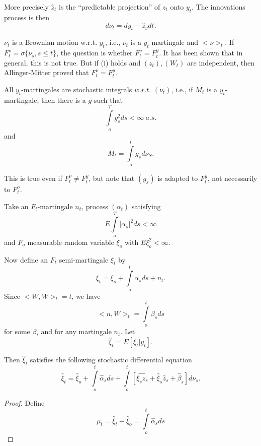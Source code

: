 More precisely $\hat{z}_t$ is the ``predictable projection'' of $z_t$
onto $y_t$. The innovations process is then  
\begin{equation}
  d \nu_t = dy_t - \hat{z}_y dt. \tag{7}\label{part2:sec1:eq7}
\end{equation}

\medskip
{}
  $\nu_t$  is a Brownian motion w.r.t. $y_t$, i.e., $\nu_t$ is a $y_t$
  martingale and $<\nu>_t$. If $F^\nu_t= \sigma\{\nu_s,s \le t\}$, the
  question is whether $F^\nu_t=F^y_t$. It has been shown that in
  general, this is not true. But if (i) holds and $(z_t), (W_t)$ are
  independent, then Allinger-Mitter proved that $F^\nu_t= F^y_t$. 


\medskip
{}
  All $y_t$-martingales are stochastic integrals $w.r.t$. $(\nu_t)$,
  i.e., if $M_t$ is a $y_t$-martingale, then there is a $g$ such that  
  $$ 
  \int\limits_{o}^T g^2_s ds < \infty ~a.s. 
  $$
  and
  $$
  M_t = \int\limits_{o}^t g_s d \nu_S. 
  $$ 

This is true even if $F^\nu_t \neq F^y_t$, but note that $(g_s)$ is
adapted to $F^y_t$, not necessarily to $F^\nu_t$. 

\medskip
{}\pageoriginale Take an
$F_t$-martingale $n_t$, process $(\alpha_t)$ satisfying  
$$
E \int\limits_{o}^T |\alpha_s|^2 ds < \infty
$$
and $F_o$ measurable random variable $\xi_o$ with $E \xi^2_o < \infty$.

\noindent
Now define an $F_t$ semi-martingale $\xi_t$ by 
\begin{equation*}
\xi_t = \xi_o + \int\limits_{o}^t \alpha_s ds + n_t. \tag{8}\label{part2:sec1:eq8}
\end{equation*}
Since $< W, W >_t =t$, we have 
$$
<n,W>_t = \int\limits_{o}^t \beta_s ds
$$
for some $\beta_t$ and for any martingale $n_t$. Let 
$$
\hat{\xi}_t= E[\xi_t|y_t].
$$

Then $\hat{\xi}_t$ satisfies the following stochastic differential
equation 
\begin{equation*}
  \hat{\xi}_t= \hat{\xi}_o +\int\limits_{o}^t \hat{\alpha}_s ds +
  \int\limits_{o}^t [\widehat{\xi_s z_s} + \hat{\xi}_s \hat{z}_s+
    \hat{\beta}_s] d \nu_s.  \tag{9}\label{part2:sec1:eq9} 
\end{equation*}

\begin{proof}
Define
$$
\mu_t = \hat{\xi}_t - \hat{\xi}_o = \int\limits_{o}^t \hat{\alpha}_s ds 
$$
\end{proof}


